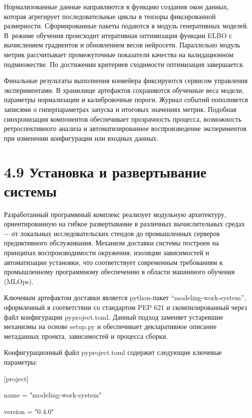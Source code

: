 \documentclass[14pt, a4paper, oneside]{extreport}
\begin{document}
Нормализованные данные направляются в функцию создания окон данных, которая агрегирует последовательные циклы в тензоры фиксированной размерности. Сформированные пакеты подаются в модуль генеративных моделей. В~режиме обучения происходит итеративная оптимизация функции ELBO с вычислением градиентов и обновлением весов нейросети. Параллельно модуль метрик рассчитывает промежуточные показатели качества на валидационном подмножестве. По достижении критериев сходимости оптимизация завершается.

Финальные результаты выполнения конвейера фиксируются сервисом управления экспериментами. В хранилище артефактов сохраняются обученные веса модели, параметры нормализации и калибровочные пороги. Журнал событий пополняется записями о гиперпараметрах запуска и итоговых значениях метрик. Подобная синхронизация компонентов обеспечивает прозрачность процесса, возможность ретроспективного анализа и автоматизированное воспроизведение экспериментов при изменении конфигурации или входных данных.

\vspace{1em}
\section{4.9 Установка и развертывание системы}
\vspace{1em}

Разработанный программный комплекс реализует модульную архитектуру, ориентированную на гибкое развертывание в различных вычислительных средах $-$ от локальных исследовательских стендов до промышленных серверов предиктивного обслуживания. Механизм доставки системы построен на принципах воспроизводимости окружения, изоляции зависимостей и автоматизации установки, что соответствует современным требованиям к промышленному программному обеспечению в области машинного обучения (MLOps).

Ключевым артефактом доставки является python-пакет “modeling-work-system”, оформленный в соответствии со стандартом PEP 621 и скомпилированный через файл конфигурации pyproject.toml. Данный подход заменяет устаревшие механизмы на основе setup.py и обеспечивает декларативное описание метаданных проекта, зависимостей и процесса сборки.

Конфигурационный файл pyproject.toml содержит следующие ключевые параметры:

[project]

name = "modeling-work-system"

version = "0.4.0"
\end{document}
